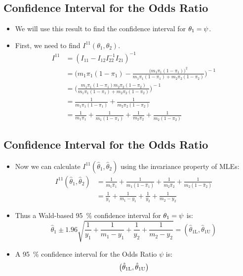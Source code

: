 \documentclass[oneside]{book}\usepackage[]{graphicx}\usepackage[svgnames]{xcolor}
\let\exp\relax%
\let\log\relax%
\begin{document}
\subsection*{Confidence Interval for the Odds Ratio}
\begin{itemize}
    \item We will use this result to find the confidence interval for $ \theta_1=\log{\psi} $.
    \item First, we need to find $ I^{11}(\theta_1,\theta_2) $.
          \begin{align*}
              I^{11}
               & =(I_{11}-I_{12}I_{22}^{-1}I_{21})^{-1}                                                                               \\
               & =\biggl(m_1\pi_1(1-\pi_1)-\frac{\bigl(m_1\pi_1(1-\pi_1)\bigr)^2}{m_1\pi_1(1-\pi_1)+m_2\pi_2(1-\pi_2)} \biggr)^{\!-1} \\
               & =\biggl(\frac{m_1\pi_1(1-\pi_1)m_2\pi_2(1-\pi_2)}{m_1\pi_1(1-\pi_1)+m_2\pi_2(1-\pi_2)} \biggr)^{\!-1}                \\
               & =\frac{1}{m_1\pi_1(1-\pi_1)}+\frac{1}{m_2\pi_2(1-\pi_2)}                                                             \\
               & =\frac{1}{m_1\pi_1} +\frac{1}{m_1(1-\pi_1)}+\frac{1}{m_2\pi_2} +\frac{1}{m_2(1-\pi_2)}
          \end{align*}
\end{itemize}
\subsection*{Confidence Interval for the Odds Ratio}
\begin{itemize}
    \item Now we can calculate $ I^{11}(\hat{\theta}_1,\hat{\theta}_2) $ using the invariance property of MLEs:
          \begin{align*}
              I^{11}(\hat{\theta}_1,\hat{\theta}_2)
               & =\frac{1}{m_1\hat{\pi}_1} +\frac{1}{m_1(1-\hat{\pi}_1)}+\frac{1}{m_2\hat{\pi}_2} +\frac{1}{m_2(1-\hat{\pi}_2)} \\
               & =\frac{1}{y_1} +\frac{1}{m_1-y_1} +\frac{1}{y_2} +\frac{1}{m_2-y_2}
          \end{align*}
    \item Thus a Wald-based \qty{95}{\percent} confidence interval for $ \theta_1=\log{\psi} $ is:
          \[ \hat{\theta}_1\pm 1.96\sqrt{\frac{1}{y_1} +\frac{1}{m_1-y_1} +\frac{1}{y_2} +\frac{1}{m_2-y_2}}=(\hat{\theta}_{1\text{L}},\hat{\theta}_{1\text{U}}) \]
    \item A \qty{95}{\percent} confidence interval for the Odds Ratio $ \psi $ is:
          \[ \bigl(\exp{\hat{\theta}_{1\text{L}}},\exp{\hat{\theta}_{1\text{U}}}\bigr) \]
\end{itemize}
\end{document}
